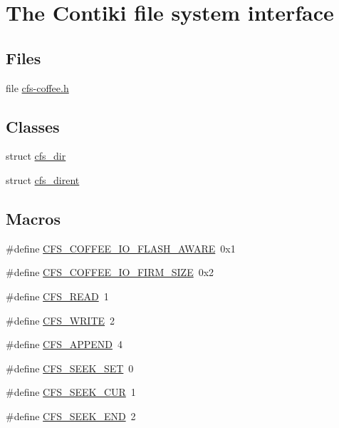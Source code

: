 \hypertarget{group__cfs}{}\section{The Contiki file system interface}
\label{group__cfs}
\subsection*{Files}
\begin{DoxyCompactItemize}
\item 
file \hyperlink{cfs-coffee_8h}{cfs-\/coffee.\+h}
\end{DoxyCompactItemize}
\subsection*{Classes}
\begin{DoxyCompactItemize}
\item 
struct \hyperlink{structcfs__dir}{cfs\+\_\+dir}
\item 
struct \hyperlink{structcfs__dirent}{cfs\+\_\+dirent}
\end{DoxyCompactItemize}
\subsection*{Macros}
\begin{DoxyCompactItemize}
\item 
\#define \hyperlink{group__cfs_ga3ba46c00491d80f860a9e531403a0a63}{C\+F\+S\+\_\+\+C\+O\+F\+F\+E\+E\+\_\+\+I\+O\+\_\+\+F\+L\+A\+S\+H\+\_\+\+A\+W\+A\+R\+E}~0x1
\item 
\#define \hyperlink{group__cfs_ga6f4139866092ae209517c8b9e8c740c1}{C\+F\+S\+\_\+\+C\+O\+F\+F\+E\+E\+\_\+\+I\+O\+\_\+\+F\+I\+R\+M\+\_\+\+S\+I\+Z\+E}~0x2
\item 
\#define \hyperlink{group__cfs_ga00fed0156dbcbd1214203c7f2507e376}{C\+F\+S\+\_\+\+R\+E\+A\+D}~1
\item 
\#define \hyperlink{group__cfs_ga798793edf50f38e3e41364f0f6f71201}{C\+F\+S\+\_\+\+W\+R\+I\+T\+E}~2
\item 
\#define \hyperlink{group__cfs_ga2b402228c26a3590f1d4bf44df0b2b82}{C\+F\+S\+\_\+\+A\+P\+P\+E\+N\+D}~4
\item 
\#define \hyperlink{group__cfs_ga72cd7360175436b7ed26606708314dc0}{C\+F\+S\+\_\+\+S\+E\+E\+K\+\_\+\+S\+E\+T}~0
\item 
\#define \hyperlink{group__cfs_ga79a4ba5a9b5924df5db6e998e84a7d53}{C\+F\+S\+\_\+\+S\+E\+E\+K\+\_\+\+C\+U\+R}~1
\item 
\#define \hyperlink{group__cfs_ga96fb6bf3f2e9f69d526f9119551bedce}{C\+F\+S\+\_\+\+S\+E\+E\+K\+\_\+\+E\+N\+D}~2
\end{DoxyCompactItemize}
